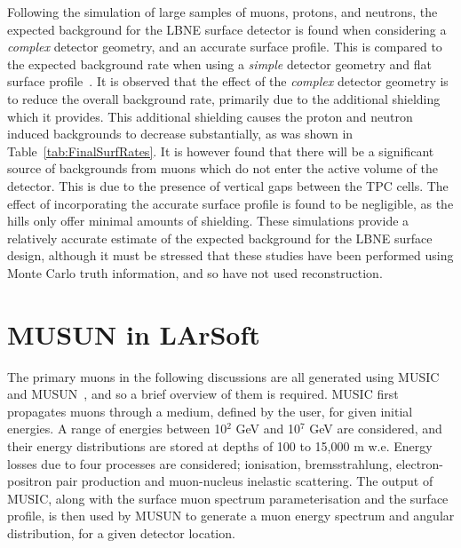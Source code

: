 Following the simulation of large samples of muons, protons, and neutrons, the expected background for the LBNE surface detector is found when considering a \emph{complex} detector geometry, and an accurate surface profile. This is compared to the expected background rate when using a \emph{simple} detector geometry and flat surface profile~\citep{MartinsThesis}. It is observed that the effect of the \emph{complex} detector geometry is to reduce the overall background rate, primarily due to the additional shielding which it provides. This additional shielding causes the proton and neutron induced backgrounds to decrease substantially, as was shown in Table~\ref{tab:FinalSurfRates}. It is however found that there will be a significant source of backgrounds from muons which do not enter the active volume of the detector. This is due to the presence of vertical gaps between the TPC cells. The effect of incorporating the accurate surface profile is found to be negligible, as the hills only offer minimal amounts of shielding. These simulations provide a relatively accurate estimate of the expected background for the LBNE surface design, although it must be stressed that these studies have been performed using Monte Carlo truth information, and so have not used reconstruction. \\

\section{MUSUN in LArSoft} \label{sec:FDIncorporation}  %
The primary muons in the following discussions are all generated using MUSIC~\citep{MUSUN, MUSIC, MUSIC2} and MUSUN~\citep{MUSUN, MUSUN2}, and so a brief overview of them is required. MUSIC first propagates muons through a medium, defined by the user, for given initial energies. A range of energies between 10$^2$ GeV and 10$^7$ GeV are considered, and their energy distributions are stored at depths of 100 to 15,000 m w.e. Energy losses due to four processes are considered; ionisation, bremsstrahlung, electron-positron pair production and muon-nucleus inelastic scattering. The output of MUSIC, along with the surface muon spectrum parameterisation and the surface profile, is then used by MUSUN to generate a muon energy spectrum and angular distribution, for a given detector location. \\

